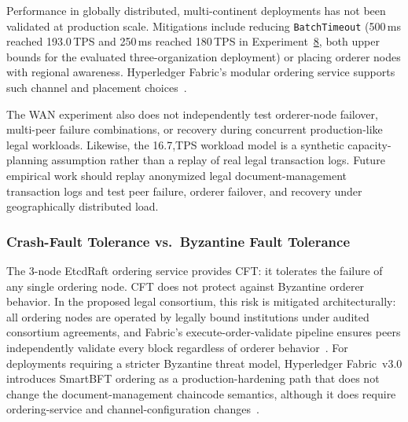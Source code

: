 \documentclass{ieeeaccess}
\begin{document}
Performance in globally distributed, multi-continent deployments has not
been validated at production scale. Mitigations include reducing
\texttt{BatchTimeout} (500\,ms reached 193.0\,TPS and 250\,ms reached
180\,TPS in Experiment~\hyperref[sec:exp_sensitivity]{8}, both upper bounds for the evaluated
three-organization deployment) or placing orderer nodes with regional
awareness. Hyperledger Fabric's modular ordering service supports such
channel and placement choices~\cite{hyperledgerFabricOrderingService_v24,woznica2022}.

The WAN experiment also does not independently test orderer-node failover,
multi-peer failure combinations, or recovery during concurrent production-like
legal workloads. Likewise, the 16.7,TPS workload model is a synthetic
capacity-planning assumption rather than a replay of real legal transaction
logs. Future empirical work should replay anonymized legal document-management
transaction logs and test peer failure, orderer failover, and recovery under
geographically distributed load.


\subsubsection{Crash-Fault Tolerance vs.\ Byzantine Fault Tolerance}
The 3-node EtcdRaft ordering service provides CFT: it tolerates the
failure of any single ordering node. CFT does not protect against
Byzantine orderer behavior. In the proposed legal consortium, this
risk is mitigated architecturally: all ordering nodes are operated
by legally bound institutions under audited consortium agreements,
and Fabric's execute-order-validate pipeline ensures peers
independently validate every block regardless of orderer
behavior~\cite{androulaki2018hyperledger}. For deployments requiring
a stricter Byzantine threat model, Hyperledger Fabric~v3.0
introduces SmartBFT ordering as a production-hardening path that does
not change the document-management chaincode semantics, although it
does require ordering-service and channel-configuration changes~\cite{fabricWhatsNew3x,fabricOrderingServiceLatest,fabricBFTConfigurationDoc}.
\end{document}
